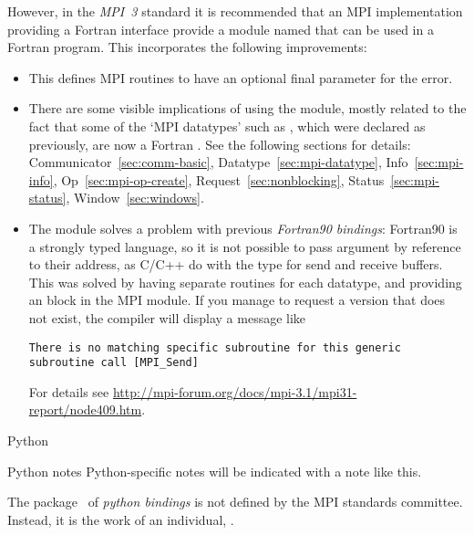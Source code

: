 %
However, in the \emph{MPI~3}%
 standard it is recommended that
an MPI implementation providing a Fortran interface provide a
module named  that can be used in a Fortran program.
This incorporates the following improvements:
\begin{itemize}
\item
  This defines MPI routines to have an optional final parameter for the error.
\item 
  There are some visible implications of using the  module,
  mostly related to the fact that some of the `MPI datatypes' such as
  , which were declared as 
  previously, are now a Fortran .
  See the following sections for details:
  Communicator~\ref{sec:comm-basic}, Datatype~\ref{sec:mpi-datatype},
  Info~\ref{sec:mpi-info}, Op~\ref{sec:mpi-op-create},
  Request~\ref{sec:nonblocking}, Status~\ref{sec:mpi-status},
  Window~\ref{sec:windows}.
\item
  The  module solves a problem with previous
  \emph{Fortran90 bindings}:
  Fortran90 is a strongly typed language, so it is not possible to pass
  argument by reference to their address, as C/C++ do with the 
  type for send and receive buffers. This was solved by having
  separate routines for each datatype, and providing an  block
  in the MPI module. If you manage to request a version that does not exist,
  the compiler will display a message like
\begin{verbatim}
There is no matching specific subroutine for this generic subroutine call [MPI_Send]
\end{verbatim}
%
For details see
\url{http://mpi-forum.org/docs/mpi-3.1/mpi31-report/node409.htm}.
\end{itemize}



 {Python}
\label{sec:python-bind}

\begin{pythonnote}{Python notes}
  Python-specific notes will be indicated with a note like this.
\end{pythonnote}

The  package~\cite{mpi4py:homepage}
of \emph{python bindings}
is not defined by the MPI standards committee.
Instead, it is the work of an individual,
.

